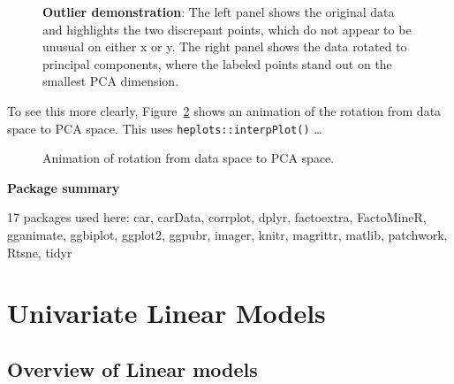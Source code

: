 \documentclass[
  letterpaper,
  10pt,
  krantz2]{krantz}
\begin{document}
\begin{figure}


\caption{\label{fig-outlier-demo}\textbf{Outlier demonstration}: The
left panel shows the original data and highlights the two discrepant
points, which do not appear to be unusual on either x or y. The right
panel shows the data rotated to principal components, where the labeled
points stand out on the smallest PCA dimension.}

\end{figure}%

To see this more clearly, Figure~\ref{fig-outlier-animation} shows an
animation of the rotation from data space to PCA space. This uses
\texttt{heplots::interpPlot()} \ldots{}

\begin{figure}

\centering{

}

\caption{\label{fig-outlier-animation}Animation of rotation from data
space to PCA space.}

\end{figure}%

\textbf{Package summary}

17 packages used here: car, carData, corrplot, dplyr, factoextra,
FactoMineR, gganimate, ggbiplot, ggplot2, ggpubr, imager, knitr,
magrittr, matlib, patchwork, Rtsne, tidyr

\part{Univariate Linear Models}

\chapter{Overview of Linear models}\label{sec-linear-models}
\end{document}
